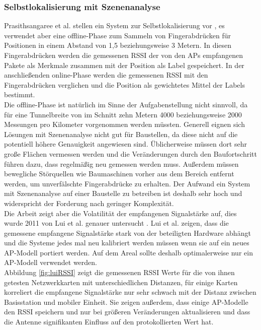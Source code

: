 \subsubsection{Selbstlokalisierung mit Szenenanalyse}
\label{ch:Vorherige:sec:RSS-basierte}
Prasithsangaree et al. stellen ein System zur Selbstlokalisierung vor \cite{prasithsangaree2002indoor}, es verwendet aber eine offline-Phase zum Sammeln von Fingerabdrücken für Positionen in einem Abstand von 1,5 beziehungsweise 3 Metern. 
In diesen Fingerabdrücken werden die gemessenen RSSI der von den APs empfangenen Pakete als Merkmale zusammen mit der Position als Label gespeichert.
In der anschließenden online-Phase werden die gemessenen RSSI mit den Fingerabdrücken verglichen und die Position als gewichtetes Mittel der Labels bestimmt. \\
Die offline-Phase ist natürlich im Sinne der Aufgabenstellung nicht sinnvoll, da für eine Tunnelbreite von im Schnitt zehn Metern 4000 beziehungsweise 2000 Messungen pro Kilometer vorgenommen werden müssten.
Generell eignen sich Lösungen mit Szenenanalyse nicht gut für Baustellen, da diese nicht auf die potentiell höhere Genauigkeit angewiesen sind. 
Üblicherweise müssen dort sehr große Flächen vermessen werden und die Veränderungen durch den Baufortschritt führen dazu, dass regelmäßig neu gemessen werden muss.
Außerdem müssen bewegliche Störquellen wie Baumaschinen vorher aus dem Bereich entfernt werden, um unverfälschte Fingerabdrücke zu erhalten.
Der Aufwand ein System mit Szenenanalyse auf einer Baustelle zu betreiben ist deshalb sehr hoch und widerspricht der Forderung nach geringer Komplexität. \\
Die Arbeit zeigt aber die Volatilität der empfangenen Signalstärke auf, dies wurde 2011 von Lui et al. genauer untersucht \cite{lui2011differences}.
Lui et al. zeigen, dass die gemessene empfangene Signalstärke stark von der beteiligten Hardware abhängt und die Systeme jedes mal neu kalibriert werden müssen wenn sie auf ein neues AP-Modell portiert werden. 
Auf dem Areal sollte deshalb optimalerweise nur ein AP-Modell verwendet werden. \\
Abbildung \ref{fig:luiRSSI} zeigt die gemessenen RSSI Werte für die von ihnen getesten Netzwerkkarten mit unterschiedlichen Distanzen, für einige Karten korreliert die empfangene Signalstärke nur sehr schwach mit der Distanz zwischen Basisstation und mobiler Einheit.
Sie zeigen außerdem, dass einige AP-Modelle den RSSI speichern und nur bei größeren Veränderungen aktualisieren und dass die Antenne signifikanten Einfluss auf den protokollierten Wert hat.

